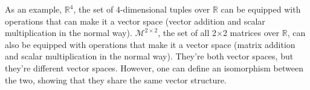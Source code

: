 As an example, $\mathbb{R}^4$, the set of 4-dimensional tuples over $\mathbb{R}$ can be equipped with operations that can make it a vector space (vector addition and scalar multiplication in the normal way). $\mathcal{M}^{2\times 2}$, the set of all 2$\times$2 matrices over $\mathbb{R}$, can also be equipped with operations that make it a vector space (matrix addition and scalar multiplication in the normal way). They're both vector spaces, but they're different vector spaces. However, one can define an isomorphism between the two, showing that they share the same vector structure.

